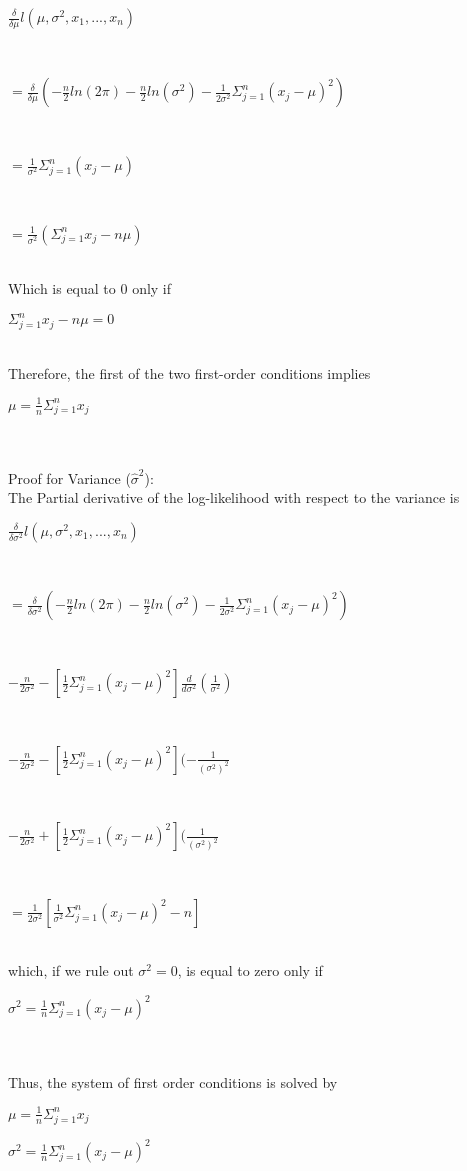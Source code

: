 \documentclass{article}
\begin{document}
\begin{enumerate}
				\centerline{$\frac{\delta}{\delta\mu} l(\mu,\sigma^2, x_1, ..., x_n)$} \\ 
				\centerline{$=\frac{\delta}{\delta\mu}(-\frac{n}{2}ln(2\pi) - \frac{n}{2}ln(\sigma^2) - \frac{1}{2\sigma^2}\Sigma_{j = 1}^n (x_j - \mu)^2)$ }\\ 
				\centerline{$=\frac{1}{\sigma^2}\Sigma_{j = 1}^n(x_j - \mu)$} \\
				\centerline{$=\frac{1}{\sigma^2}(\Sigma_{j = 1}^n x_j - n\mu)$} \\
				Which is equal to $0$ only if \\
				\centerline{$\Sigma_{j = 1}^n x_j - n\mu = 0$ }\\
				Therefore, the first of the two first-order conditions implies \\
				\centerline{$\mu = \frac{1}{n}\Sigma_{j = 1}^n x_j$ }\\ \\
			Proof for Variance ($\hat \sigma^2$): \\
			The Partial derivative of the log-likelihood with respect to the variance is\\
			\centerline{$\frac{\delta}{\delta\sigma^2} l(\mu,\sigma^2, x_1, ..., x_n)$} \\
			\centerline{$=\frac{\delta}{\delta\sigma^2}(-\frac{n}{2}ln(2\pi) - \frac{n}{2}ln(\sigma^2) - \frac{1}{2\sigma^2}\Sigma_{j = 1}^n (x_j - \mu)^2)$} \\
			\centerline{$-\frac{n}{2\sigma^2} - [\frac{1}{2}\Sigma_{j = 1}^n (x_j - \mu)^2]\frac{d}{d\sigma^2}(\frac{1}{\sigma^2})$} \\
			\centerline{$-\frac{n}{2\sigma^2} - [\frac{1}{2}\Sigma_{j = 1}^n (x_j - \mu)^2](-\frac{1}{(\sigma^2)^2}$} \\
			\centerline{$-\frac{n}{2\sigma^2} + [\frac{1}{2}\Sigma_{j = 1}^n (x_j - \mu)^2](\frac{1}{(\sigma^2)^2}$} \\
			\centerline{$=\frac{1}{2\sigma^2}[\frac{1}{\sigma^2}\Sigma_{j = 1}^n (x_j - \mu)^2 -n]$} \\
			which, if we rule out $\sigma^2 = 0$, is equal to zero only if \\
			\centerline{$\sigma^2 = \frac{1}{n} \Sigma_{j = 1}^n (x_j - \mu)^2$}\\
			\\ Thus, the system of first order conditions is solved by \\
			\centerline{$\mu = \frac{1}{n}\Sigma_{j = 1}^n x_j$ }
			\centerline{$\sigma^2 = \frac{1}{n} \Sigma_{j = 1}^n (x_j - \mu)^2$}\\
		

\end{enumerate}
\end{document}
